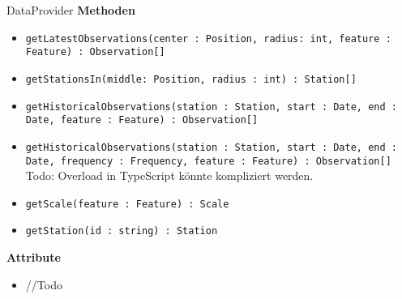 \begin{Class}{DataProvider}
    \textbf{Methoden}
    \begin{itemize}
        \item \texttt{getLatestObservations(center : Position, radius: int, feature : Feature) : Observation[]}
        \item \texttt{getStationsIn(middle: Position, radius : int) : Station[]}
        \item \texttt{getHistoricalObservations(station : Station, start : Date, end : Date, feature : Feature) : Observation[]}
        \item \texttt{getHistoricalObservations(station : Station, start : Date, end : Date, frequency : Frequency, feature : Feature) : Observation[]}
	\\Todo: Overload in TypeScript könnte kompliziert werden.
        \item \texttt{getScale(feature : Feature) : Scale}
        \item \texttt{getStation(id : string) : Station}
    \end{itemize}
    
    \textbf{Attribute}
    \begin{itemize}
        \item //Todo
    \end{itemize}
\end{Class}
